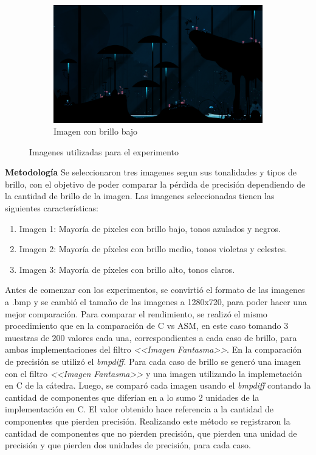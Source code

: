 \documentclass[a4paper]{article}
\begin{document}
\begin{figure}[h]
	\hfill
	\begin{subfigure}[b]{0.3 \textwidth}
		\includegraphics[width=\textwidth]{img/oscura2.png}
		\caption{Imagen con brillo bajo}
	\end{subfigure}
	\caption{Imagenes utilizadas para el experimento}
\end{figure}
\newpage
\justify
\textbf{Metodología}
\justify
Se seleccionaron tres imagenes segun sus tonalidades y tipos de brillo, con el objetivo de poder comparar la pérdida de precisión dependiendo de la cantidad de brillo de la imagen. 
\justify
Las imagenes seleccionadas tienen las siguientes características:
\begin{enumerate}
	\item Imagen 1: Mayoría de pixeles con brillo bajo, tonos azulados y negros.
	\item Imagen 2: Mayoría de píxeles con brillo medio, tonos violetas y celestes.
	\item Imagen 3: Mayoría de píxeles con brillo alto, tonos claros. 
\end{enumerate}
\justify
Antes de comenzar con los experimentos, se convirtió el formato de las imagenes a .bmp y se cambió el tamaño de las imagenes a 1280x720, para poder hacer una mejor comparación.
\justify
Para comparar el rendimiento, se realizó el mismo procedimiento que en la comparación de C vs ASM, en este caso tomando 3 muestras de 200 valores cada una, correspondientes a cada caso de brillo, para ambas implementaciones del filtro \textit{<<Imagen Fantasma>>}. 
\justify
En la comparación de precisión se utilizó el \textit{bmpdiff}. Para cada caso de brillo se generó una imagen con el filtro \textit{<<Imagen Fantasma>>}  y una imagen utilizando la implemetación en C de la cátedra. Luego, se comparó cada imagen usando el \textit{bmpdiff} contando la cantidad de componentes que diferían en a lo sumo 2 unidades de la implementación en C. El valor obtenido hace referencia a la cantidad de componentes que pierden precisión. Realizando este método se registraron la cantidad de componentes que no pierden precisión, que pierden una unidad de precisión y que pierden dos unidades de precisión, para cada caso.
\end{document}
